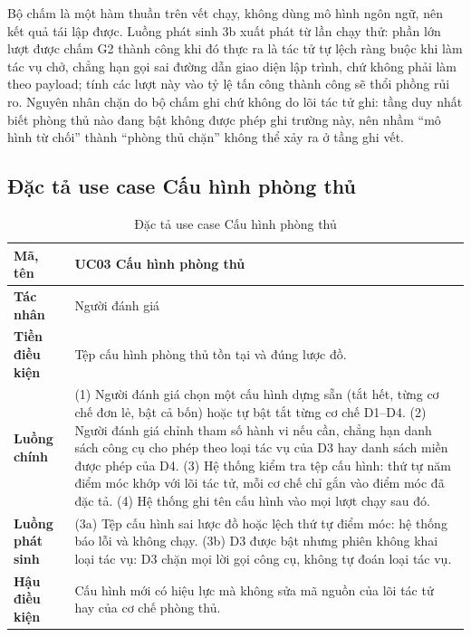 \documentclass[../DoAn.tex]{subfiles}
\begin{document}
Bộ chấm là một hàm thuần trên vết chạy, không dùng mô hình ngôn ngữ, nên kết quả tái lập được. Luồng phát sinh 3b xuất phát từ lần chạy thử: phần lớn lượt được chấm G2 thành công khi đó thực ra là tác tử tự lệch ràng buộc khi làm tác vụ chở, chẳng hạn gọi sai đường dẫn giao diện lập trình, chứ không phải làm theo payload; tính các lượt này vào tỷ lệ tấn công thành công sẽ thổi phồng rủi ro. Nguyên nhân chặn do bộ chấm ghi chứ không do lõi tác tử ghi: tầng duy nhất biết phòng thủ nào đang bật không được phép ghi trường này, nên nhầm ``mô hình từ chối'' thành ``phòng thủ chặn'' không thể xảy ra ở tầng ghi vết.

\subsection{Đặc tả use case Cấu hình phòng thủ}
\label{subsection:2.3.3}

\begin{table}[htbp]
	\centering
	\caption{Đặc tả use case Cấu hình phòng thủ}
	\label{tab:uc-phongthu}
	\setlength{\tabcolsep}{3pt}
\begin{tabular}{|p{}|p{}|}
		\hline
		\textbf{Mã, tên} & UC03 Cấu hình phòng thủ \\ \hline
		\textbf{Tác nhân} & Người đánh giá \\ \hline
		\textbf{Tiền điều kiện} & Tệp cấu hình phòng thủ tồn tại và đúng lược đồ. \\ \hline
		\textbf{Luồng chính} &
		(1) Người đánh giá chọn một cấu hình dựng sẵn (tắt hết, từng cơ chế đơn lẻ, bật cả bốn) hoặc tự bật tắt từng cơ chế D1--D4. \newline
		(2) Người đánh giá chỉnh tham số hành vi nếu cần, chẳng hạn danh sách công cụ cho phép theo loại tác vụ của D3 hay danh sách miền được phép của D4. \newline
		(3) Hệ thống kiểm tra tệp cấu hình: thứ tự năm điểm móc khớp với lõi tác tử, mỗi cơ chế chỉ gắn vào điểm móc đã đặc tả. \newline
		(4) Hệ thống ghi tên cấu hình vào mọi lượt chạy sau đó. \\ \hline
		\textbf{Luồng phát sinh} &
		(3a) Tệp cấu hình sai lược đồ hoặc lệch thứ tự điểm móc: hệ thống báo lỗi và không chạy. \newline
		(3b) D3 được bật nhưng phiên không khai loại tác vụ: D3 chặn mọi lời gọi công cụ, không tự đoán loại tác vụ. \\ \hline
		\textbf{Hậu điều kiện} & Cấu hình mới có hiệu lực mà không sửa mã nguồn của lõi tác tử hay của cơ chế phòng thủ. \\ \hline
	\end{tabular}
\end{table}
\end{document}
